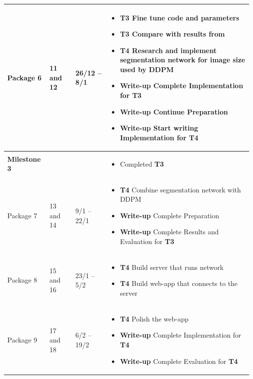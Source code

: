 \documentclass{article}
\begin{document}
\begin{longtable}{p{2.5cm}p{1.5cm}P{2.5cm}P{6.8cm}}
    Package 6 &
    11 and 12  &
    26/12 -- 8/1 &
    \begin{itemize}[label={--},noitemsep,leftmargin=*,topsep=0pt,partopsep=0pt]
        \item \textbf{T3} Fine tune code and parameters
        \item \textbf{T3} Compare with results from \cite{Saharia-2022}
        \item \textbf{T4} Research and implement segmentation network for image size used by DDPM
        \item \textbf{Write-up} Complete Implementation for \textbf{T3}
        \item \textbf{Write-up} Continue Preparation
        \item \textbf{Write-up} Start writing Implementation for \textbf{T4} 
    \end{itemize}\\
    \hline
    
    \textbf{Milestone 3} &
    &
    &
    \begin{itemize}[label={--},noitemsep,leftmargin=*,topsep=0pt,partopsep=0pt]
        \item Completed \textbf{T3}
    \end{itemize}\\
    \hline
    
    Package 7 &
    13 and 14  &
    9/1 -- 22/1 &
    \begin{itemize}[label={--},noitemsep,leftmargin=*,topsep=0pt,partopsep=0pt]
        \item \textbf{T4} Combine segmentation network with DDPM
        \item \textbf{Write-up} Complete Preparation
        \item \textbf{Write-up} Complete Results and Evaluation for \textbf{T3} 
    \end{itemize}\\
    \hline
    
    Package 8 &
    15 and 16  &
    23/1 -- 5/2 &
    \begin{itemize}[label={--},noitemsep,leftmargin=*,topsep=0pt,partopsep=0pt]
        \item \textbf{T4} Build server that runs network
        \item \textbf{T4} Build web-app that connects to the server
    \end{itemize}\\
    \hline
    
    Package 9 &
    17 and 18  &
    6/2 -- 19/2 &
    \begin{itemize}[label={--},noitemsep,leftmargin=*,topsep=0pt,partopsep=0pt]
        \item \textbf{T4} Polish the web-app
        \item \textbf{Write-up} Complete Implementation for \textbf{T4}
        \item \textbf{Write-up} Complete Evaluation for \textbf{T4}
        \end{itemize}\\
    \hline
    

\end{longtable}
\end{document}
